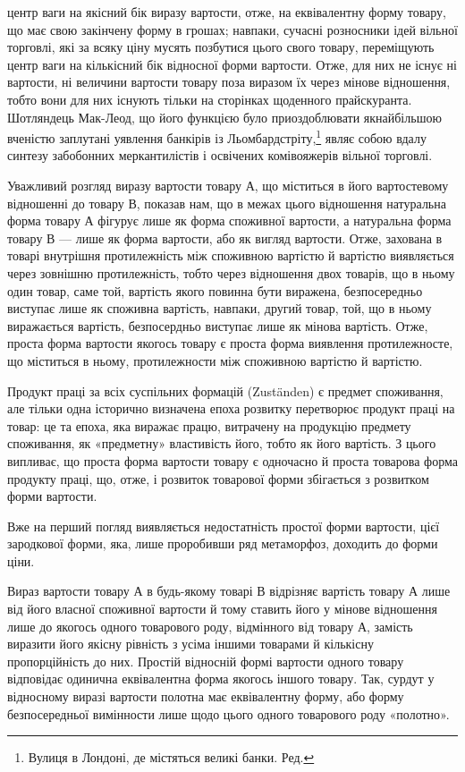 \parcont{}  %
центр ваги на якісний бік виразу вартости, отже, на еквівалентну
форму товару, що має свою закінчену форму в грошах; навпаки,
сучасні розносники ідей вільної торговлі, які за всяку ціну мусять
позбутися цього свого товару, переміщують центр ваги на
кількісний бік відносної форми вартости. Отже, для них не існує
ні вартости, ні величини вартости товару поза виразом їх через
мінове відношення, тобто вони для них існують тільки на сторінках
щоденного прайскуранта. Шотляндець Мак-Леод, що його
функцією було приоздоблювати якнайбільшою вченістю заплутані
уявлення банкірів із Льомбардстріту,\footnote*{
Вулиця в Лондоні, де містяться великі банки. Ред.
} являє собою вдалу синтезу
забобонних меркантилістів і освічених комівояжерів вільної
торговлі.

Уважливий розгляд виразу вартости товару А, що міститься
в його вартостевому відношенні до товару В, показав нам, що
в межах цього відношення натуральна форма товару А фігурує
лише як форма споживної вартости, а натуральна форма товару
В — лише як форма вартости, або як вигляд вартости. Отже,
захована в товарі внутрішня протилежність між споживною вартістю
й вартістю виявляється через зовнішню протилежність, тобто
через відношення двох товарів, що в ньому один товар, саме той,
вартість якого повинна бути виражена, безпосередньо виступає
лише як споживна вартість, навпаки, другий товар, той, що в
ньому виражається вартість, безпосердньо виступає лише як
мінова вартість. Отже, проста форма вартости якогось товару
є проста форма виявлення протилежносте, що міститься в ньому,
протилежности між споживною вартістю й вартістю.

Продукт праці за всіх суспільних формацій (Zuständen) є
предмет споживання, але тільки одна історично визначена епоха
розвитку перетворює продукт праці на товар: це та епоха, яка
виражає працю, витрачену на продукцію предмету споживання,
як «предметну» властивість його, тобто як його вартість. З цього
випливає, що проста форма вартости товару є одночасно й проста
товарова форма продукту праці, що, отже, і розвиток товарової
форми збігається з розвитком форми вартости.

Вже на перший погляд виявляється недостатність простої
форми вартости, цієї зародкової форми, яка, лише проробивши
ряд метаморфоз, доходить до форми ціни.

Вираз вартости товару А в будь-якому товарі В відрізняє
вартість товару А лише від його власної споживної вартости й
тому ставить його у мінове відношення лише до якогось одного
товарового роду, відмінного від товару А, замість виразити його
якісну рівність з усіма іншими товарами й кількісну пропорційність
до них. Простій відносній формі вартости одного товару відповідає
одинична еквівалентна форма якогось іншого товару.
Так, сурдут у відносному виразі вартости полотна має еквівалентну
форму, або форму безпосередньої вимінности лише щодо
цього одного товарового роду «полотно».
